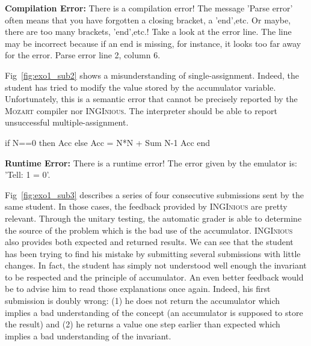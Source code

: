 \documentclass[11pt,a4paper,twoside,openright]{report}
\begin{document}
  \textbf{Compilation Error:} There is a compilation error! The message 
  'Parse error' often means that you have forgotten a closing bracket, a 
  'end',etc. Or maybe, there are too many brackets, 'end',etc.! Take a look at 
  the error line. The line may be incorrect because if an end is 
  missing, for instance, it looks too far away for the error. Parse error line  
  2, column 6.\\
  \label{fig:exo1_sub1}
  


Fig~\ref{fig:exo1_sub2} shows a misunderstanding of single-assignment. Indeed, 
the student has tried to modify the value stored by the accumulator variable. 
Unfortunately, this is a semantic error that cannot be precisely reported by 
the \textsc{Mozart} compiler nor \textsc{INGInious}. The interpreter should be 
able to report unsuccessful multiple-assignment.\\

  \begin{OZ}
    if N==0 then Acc
    else Acc = N*N + {Sum N-1 Acc}
    end
  \end{OZ}
  \textbf{Runtime Error:} There is a runtime error! The error given 
  by the emulator is: 'Tell: 1 = 0'.\\
  \label{fig:exo1_sub2}


Fig~\ref{fig:exo1_sub3} describes a series of four consecutive submissions sent 
by the same student. In those cases, the feedback provided by 
\textsc{INGInious} are pretty relevant. Through the unitary testing, the 
automatic grader is able to determine the source of the problem which is the 
bad use of the accumulator. \textsc{INGInious} also provides both expected 
and returned results. We can see that the student has been trying to find his mistake 
by submitting several submissions with little changes. In fact, the student has 
simply not understood well enough the invariant to be respected and the principle of 
accumulator. An even better feedback would be to advise him to read those 
explanations once again. Indeed, his first submission is doubly wrong: (1) he 
does not return the accumulator which implies a bad understanding of the 
concept (an accumulator is supposed to store the result) and (2) he 
returns a value one step earlier than expected which implies a bad 
understanding of the invariant.
\end{document}
